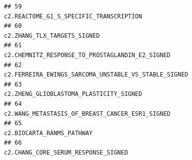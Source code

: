 \documentclass{article}\usepackage[]{graphicx}\usepackage[]{color}
\makeatletter
\newenvironment{kframe}{%
 \def\at@end@of@kframe{}%
 \ifinner\ifhmode%
  \def\at@end@of@kframe{\end{minipage}}%
  \begin{minipage}{\columnwidth}%
 \fi\fi%
 \def\FrameCommand##1{\hskip\@totalleftmargin \hskip-\fboxsep
 \colorbox{shadecolor}{##1}\hskip-\fboxsep
     \hskip-\linewidth \hskip-\@totalleftmargin \hskip\columnwidth}%
 \MakeFramed {\advance\hsize-\width
   \@totalleftmargin\z@ \linewidth\hsize
   \@setminipage}}%
 {\par\unskip\endMakeFramed%
 \at@end@of@kframe}
\newenvironment{knitrout}{}{} %
\makeatother
\begin{document}
\begin{knitrout}
\begin{kframe}
\begin{verbatim}
## 59                                                                                                                                                                                                                                                                                                                c2.REACTOME_G1_S_SPECIFIC_TRANSCRIPTION
## 60                                                                                                                                                                                                                                                                                                                            c2.ZHANG_TLX_TARGETS_SIGNED
## 61                                                                                                                                                                                                                                                                                                        c2.CHEMNITZ_RESPONSE_TO_PROSTAGLANDIN_E2_SIGNED
## 62                                                                                                                                                                                                                                                                                                   c2.FERREIRA_EWINGS_SARCOMA_UNSTABLE_VS_STABLE_SIGNED
## 63                                                                                                                                                                                                                                                                                                                c2.ZHENG_GLIOBLASTOMA_PLASTICITY_SIGNED
## 64                                                                                                                                                                                                                                                                                                        c2.WANG_METASTASIS_OF_BREAST_CANCER_ESR1_SIGNED
## 65                                                                                                                                                                                                                                                                                                                              c2.BIOCARTA_RANMS_PATHWAY
## 66                                                                                                                                                                                                                                                                                                                    c2.CHANG_CORE_SERUM_RESPONSE_SIGNED

\end{verbatim}
\end{kframe}
\end{knitrout}
\end{document}
